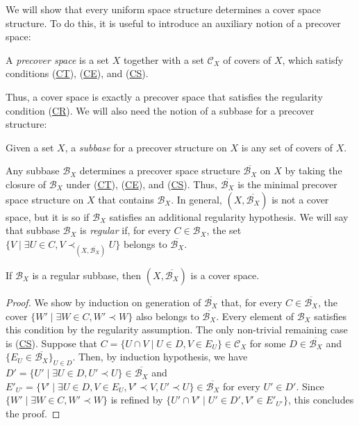 \documentclass[reqno]{amsart}
\newcommand{\axref}[1]{(\hyperref[ax:#1]{#1})}
\theoremstyle{definition}
\theoremstyle{remark}
\numberwithin{figure}{section}
\newcommand{\rb}{\prec}
\begin{document}
We will show that every uniform space structure determines a cover space structure.
To do this, it is useful to introduce an auxiliary notion of a precover space:

\begin{defn}
A \emph{precover space} is a set $X$ together with a set $\mathcal{C}_X$ of covers of $X$, which satisfy conditions \axref{CT}, \axref{CE}, and \axref{CS}.
\end{defn}

Thus, a cover space is exactly a precover space that satisfies the regularity condition \axref{CR}.
We will also need the notion of a subbase for a precover structure:

\begin{defn}
Given a set $X$, a \emph{subbase} for a precover structure on $X$ is any set of covers of $X$.
\end{defn}

Any subbase $\mathcal{B}_X$ determines a precover space structure $\overline{\mathcal{B}_X}$ on $X$ by taking the closure of $\mathcal{B}_X$ under \axref{CT}, \axref{CE}, and \axref{CS}.
Thus, $\overline{\mathcal{B}_X}$ is the minimal precover space structure on $X$ that contains $\mathcal{B}_X$.
In general, $(X,\overline{\mathcal{B}_X})$ is not a cover space, but it is so if $\mathcal{B}_X$ satisfies an additional regularity hypothesis.
We will say that subbase $\mathcal{B}_X$ is \emph{regular} if, for every $C \in \mathcal{B}_X$, the set $\{ V \mid \exists U \in C, V \rb_{(X,\overline{\mathcal{B}_X})} U \}$ belongs to $\overline{\mathcal{B}_X}$.

\begin{prop}
If $\mathcal{B}_X$ is a regular subbase, then $(X,\overline{\mathcal{B}_X})$ is a cover space.
\end{prop}
\begin{proof}
We show by induction on generation of $\overline{\mathcal{B}_X}$ that, for every $C \in \overline{\mathcal{B}_X}$, the cover $\{ W' \mid \exists W \in C, W' \rb W \}$ also belongs to $\overline{\mathcal{B}_X}$.
Every element of $\mathcal{B}_X$ satisfies this condition by the regularity assumption.
The only non-trivial remaining case is \axref{CS}.
Suppose that $C = \{ U \cap V \mid U \in D, V \in E_U \} \in \mathcal{C}_X$ for some $D \in \overline{\mathcal{B}_X}$ and $\{ E_U \in \overline{\mathcal{B}_X} \}_{U \in D}$.
Then, by induction hypothesis, we have $D' = \{ U' \mid \exists U \in D, U' \rb U \} \in \overline{\mathcal{B}_X}$ and $E'_{U'} = \{ V' \mid \exists U \in D, V \in E_U, V' \rb V, U' \rb U \} \in \overline{\mathcal{B}_X}$ for every $U' \in D'$.
Since $\{ W' \mid \exists W \in C, W' \rb W \}$ is refined by $\{ U' \cap V' \mid U' \in D', V' \in E'_{U'} \}$, this concludes the proof.
\end{proof}
\end{document}

